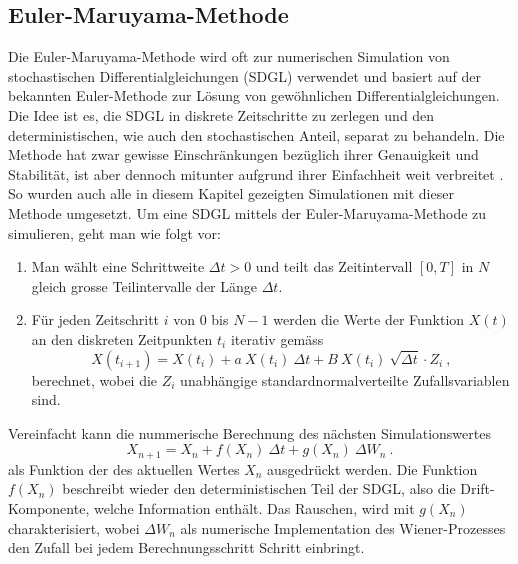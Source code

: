 \subsection{Euler-Maruyama-Methode\label{brown:Simulation}}

Die Euler-Maruyama-Methode wird oft zur numerischen Simulation von stochastischen Differentialgleichungen (SDGL) verwendet und basiert auf der bekannten Euler-Methode zur Lösung von gewöhnlichen Differentialgleichungen. Die Idee ist es, die SDGL in diskrete Zeitschritte zu zerlegen und den deterministischen, wie auch den stochastischen Anteil, separat zu behandeln. Die Methode hat zwar gewisse Einschränkungen bezüglich ihrer Genauigkeit und Stabilität, ist aber dennoch mitunter aufgrund ihrer Einfachheit weit verbreitet \cite{Bayram2018}. So wurden auch alle in diesem Kapitel gezeigten Simulationen mit dieser Methode umgesetzt. Um eine SDGL mittels der Euler-Maruyama-Methode zu simulieren, geht man wie folgt vor:




\begin{enumerate}
	\item Man wählt eine Schrittweite $ \Delta t > 0 $ und teilt das Zeitintervall $ [0, T] $ in $ N $ gleich grosse Teilintervalle der Länge $ \Delta t $.
	\item Für jeden Zeitschritt $ i $ von $ 0 $ bis $ N-1 $ werden die Werte der Funktion $ X(t) $ an den diskreten Zeitpunkten $ t_i $ iterativ gemäss
	\begin{equation}
		X(t_{i+1}) = X(t_i) + a \ X(t_i) \ \Delta t + B \ X(t_i) \ \sqrt{\Delta t} \cdot Z_i \ ,
	\end{equation}
	berechnet, wobei die $ Z_i $ unabhängige standardnormalverteilte Zufallsvariablen sind.
\end{enumerate}

Vereinfacht kann die nummerische Berechnung des nächsten Simulationswertes
\begin{equation}
	X_{n+1} = X_n + f(X_n) \ \Delta t + g(X_n) \ \Delta W_n \ .
\end{equation}
als Funktion der des aktuellen Wertes  $ X_n $ ausgedrückt werden. Die Funktion $ f(X_n) $ beschreibt wieder den deterministischen Teil der SDGL, also die Drift-Komponente, welche Information enthält. Das Rauschen, wird mit $ g(X_n) $ charakterisiert, wobei $ \Delta W_n $ als numerische Implementation des Wiener-Prozesses den Zufall bei jedem Berechnungsschritt Schritt einbringt.



